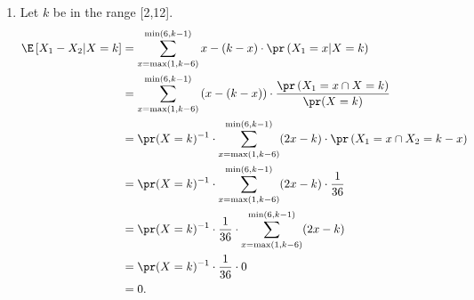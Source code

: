 \begin{enumerate}
  \item[(d)] Let $k$ be in the range [2,12].
    \begin{align*}
      \E\left[ X_1 - X_2 | X = k \right]
        &= \sum_{x = \max(1, k-6)}^{\min(6, k-1)} x - (k - x) \cdot \pr\left( X_1 = x | X = k \right) \\
        &= \sum_{x = \max(1, k-6)}^{\min(6, k-1)} \left(x - (k - x)\right) \cdot \frac{\pr\left( X_1 = x \cap X = k \right)}{\pr(X = k)} \\
        &= \pr(X = k)^{-1} \cdot \sum_{x = \max(1, k-6)}^{\min(6, k-1)} (2x - k) \cdot \pr\left( X_1 = x \cap X_2 = k - x \right) \\
        &= \pr(X = k)^{-1} \cdot \sum_{x = \max(1, k-6)}^{\min(6, k-1)} (2x - k) \cdot \frac{1}{36} \\
        &= \pr(X = k)^{-1} \cdot \frac{1}{36} \cdot \sum_{x = \max(1, k-6)}^{\min(6, k-1)} (2x - k)  \\
        &= \pr(X = k)^{-1} \cdot \frac{1}{36} \cdot 0 \\
        &= 0.
    \end{align*}
\end{enumerate}

